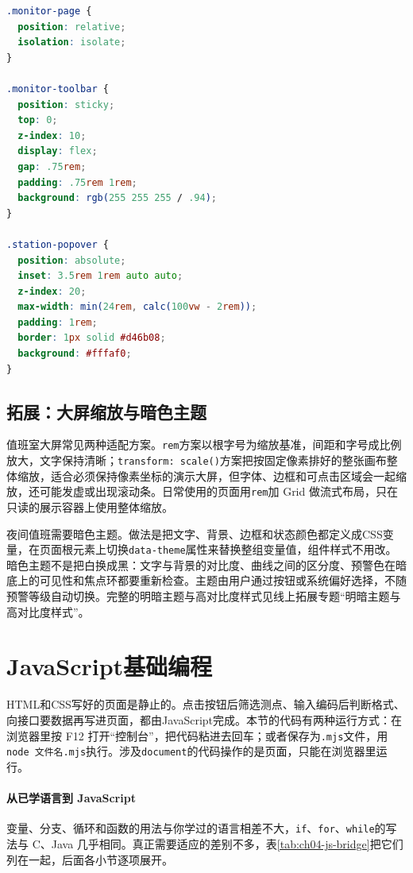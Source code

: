 \begin{lstlisting}[label={lst:ch04-css-position},language=CSS,caption={监测工具条与预警浮层的定位}]
.monitor-page {
  position: relative;
  isolation: isolate;
}

.monitor-toolbar {
  position: sticky;
  top: 0;
  z-index: 10;
  display: flex;
  gap: .75rem;
  padding: .75rem 1rem;
  background: rgb(255 255 255 / .94);
}

.station-popover {
  position: absolute;
  inset: 3.5rem 1rem auto auto;
  z-index: 20;
  max-width: min(24rem, calc(100vw - 2rem));
  padding: 1rem;
  border: 1px solid #d46b08;
  background: #fffaf0;
}
\end{lstlisting}

\subsection{拓展：大屏缩放与暗色主题}

值班室大屏常见两种适配方案。\texttt{rem}方案以根字号为缩放基准，间距和字号成比例放大，文字保持清晰；\texttt{transform: scale()}方案把按固定像素排好的整张画布整体缩放，适合必须保持像素坐标的演示大屏，但字体、边框和可点击区域会一起缩放，还可能发虚或出现滚动条。日常使用的页面用\texttt{rem}加 Grid 做流式布局，只在只读的展示容器上使用整体缩放。

夜间值班需要暗色主题。做法是把文字、背景、边框和状态颜色都定义成CSS变量，在页面根元素上切换\texttt{data-theme}属性来替换整组变量值，组件样式不用改。暗色主题不是把白换成黑：文字与背景的对比度、曲线之间的区分度、预警色在暗底上的可见性和焦点环都要重新检查。主题由用户通过按钮或系统偏好选择，不随预警等级自动切换。完整的明暗主题与高对比度样式见线上拓展专题“明暗主题与高对比度样式”。

\section{JavaScript基础编程}


HTML和CSS写好的页面是静止的。点击按钮后筛选测点、输入编码后判断格式、向接口要数据再写进页面，都由JavaScript完成。本节的代码有两种运行方式：在浏览器里按 F12 打开“控制台”，把代码粘进去回车；或者保存为\texttt{.mjs}文件，用\texttt{node 文件名.mjs}执行。涉及\texttt{document}的代码操作的是页面，只能在浏览器里运行。

\paragraph{从已学语言到 JavaScript}变量、分支、循环和函数的用法与你学过的语言相差不大，\texttt{if}、\texttt{for}、\texttt{while}的写法与 C、Java 几乎相同。真正需要适应的差别不多，表\ref{tab:ch04-js-bridge}把它们列在一起，后面各小节逐项展开。

